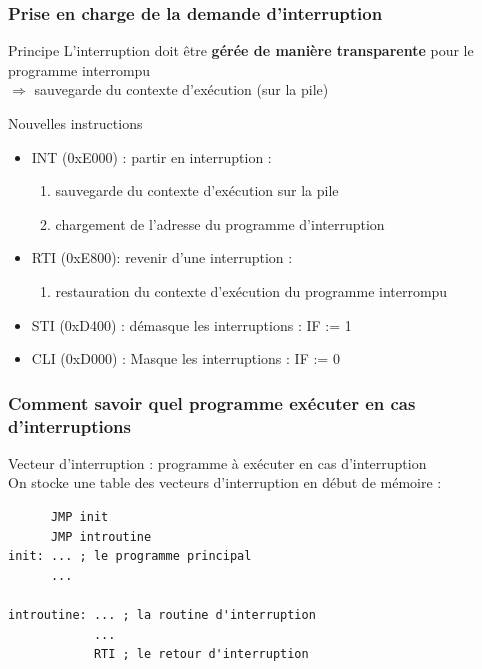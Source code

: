 \documentclass{beamer}
\begin{document}
\begin{frame}
\frametitle{Prise en charge de la demande d'interruption}

\begin{block}{Principe}
L'interruption doit être \textbf{gérée de manière transparente} pour le programme interrompu\\
$\Rightarrow$ sauvegarde du contexte d'exécution (sur la pile)
\end{block}

\begin{block}{Nouvelles instructions}
\begin{itemize}
\item INT (0xE000) : partir en interruption :
\begin{enumerate}
\item sauvegarde du contexte d'exécution sur la pile
\item chargement de l'adresse du programme d'interruption
\end{enumerate}
\item RTI (0xE800): revenir d'une interruption :
\begin{enumerate}
\item restauration du contexte d'exécution du programme interrompu
\end{enumerate}
\item STI (0xD400) : démasque les interruptions : IF := 1
\item CLI (0xD000) : Masque les interruptions : IF := 0
\end{itemize}
\end{block}

\end{frame}

\begin{frame}[fragile]
\frametitle{Comment savoir quel programme exécuter en cas d'interruptions}

Vecteur d'interruption : programme à exécuter en cas d'interruption\\
On stocke une table des vecteurs d'interruption en début de mémoire :

\begin{verbatim}
      JMP init
      JMP introutine
init: ... ; le programme principal
      ...

introutine: ... ; la routine d'interruption
            ...
            RTI ; le retour d'interruption
\end{verbatim}

\end{frame}
\end{document}
